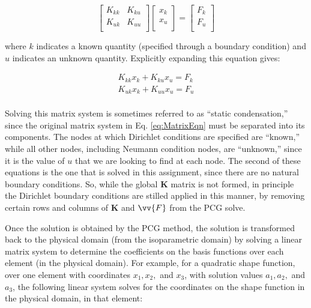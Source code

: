 \documentclass[10pt]{article}
\begin{document}
\begin{equation}
\label{eq:condensation}
\begin{bmatrix}
	K_{kk} & K_{ku}\\
	K_{uk} & K_{uu}\\
\end{bmatrix}
\begin{bmatrix}
	x_k\\
	x_u\\
\end{bmatrix}
=
\begin{bmatrix}
	F_k\\
	F_u\\
\end{bmatrix}
\end{equation}

where \(k\) indicates a known quantity (specified through a boundary condition) and \(u\) indicates an unknown quantity.   Explicitly expanding this equation gives:

\begin{equation}
\begin{aligned}
K_{kk}x_k+K_{ku}x_u=F_k\\
K_{uk}x_k+K_{uu}x_u=F_u\\
\end{aligned}
\end{equation}

Solving this matrix system is sometimes referred to as ``static condensation,'' since the original matrix system in Eq. \eqref{eq:MatrixEqn} must be separated into its components. The nodes at which Dirichlet conditions are specified are ``known,'' while all other nodes, including Neumann condition nodes, are ``unknown,'' since it is the value of \(u\) that we are looking to find at each node. The second of these equations is the one that is solved in this assignment, since there are no natural boundary conditions. So, while the global \textbf{K} matrix is not formed, in principle the Dirichlet boundary conditions are stilled applied in this manner, by removing certain rows and columns of \textbf{K} and \(\vv{F}\) from the PCG solve.

Once the solution is obtained by the PCG method, the solution is transformed back to the physical domain (from the isoparametric domain) by solving a linear matrix system to determine the coefficients on the basis functions over each element (in the physical domain). For example, for a quadratic shape function, over one element with coordinates \(x_1, x_2,\) and \(x_3\), with solution values \(a_1, a_2,\) and \(a_3\), the following linear system solves for the coordinates on the shape function in the physical domain, in that element:
\end{document}
